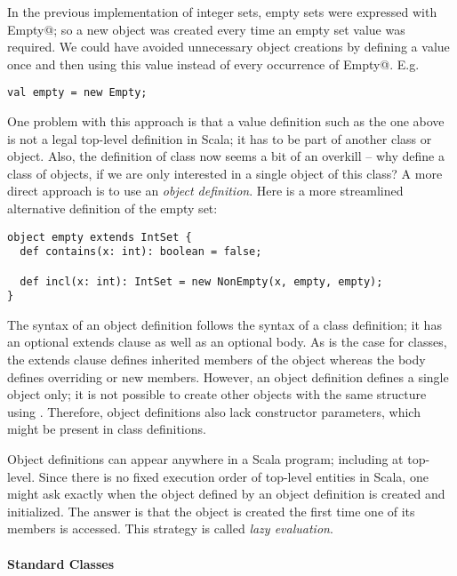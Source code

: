 \documentclass[11pt]{book}
\begin{document}
In the previous implementation of integer sets, empty sets were
expressed with \verb@new Empty@; so a new object was created every time
an empty set value was required. We could have avoided unnecessary
object creations by defining a value \verb@empty@ once and then using
this value instead of every occurrence of \verb@new Empty@. E.g.
\begin{verbatim}
val empty = new Empty;
\end{verbatim}
One problem with this approach is that a value definition such as the
one above is not a legal top-level definition in Scala; it has to be
part of another class or object. Also, the definition of class
\verb@Empty@ now seems a bit of an overkill -- why define a class of objects, 
if we are only interested in a single object of this class? A more
direct approach is to use an {\em object definition}. Here is
a more streamlined alternative definition of the empty set:
\begin{verbatim}
object empty extends IntSet {
  def contains(x: int): boolean = false;

  def incl(x: int): IntSet = new NonEmpty(x, empty, empty);
}
\end{verbatim}
The syntax of an object definition follows the syntax of a class
definition; it has an optional extends clause as well as an optional
body. As is the case for classes, the extends clause defines inherited
members of the object whereas the body defines overriding or new
members.  However, an object definition defines a single object only;
it is not possible to create other objects with the same structure
using \verb@new@.  Therefore, object definitions also lack constructor
parameters, which might be present in class definitions.

Object definitions can appear anywhere in a Scala program; including
at top-level.  Since there is no fixed execution order of top-level
entities in Scala, one might ask exactly when the object defined by an
object definition is created and initialized. The answer is that the
object is created the first time one of its members is accessed. This
strategy is called {\em lazy evaluation}.

\paragraph{Standard Classes}
\end{document}
